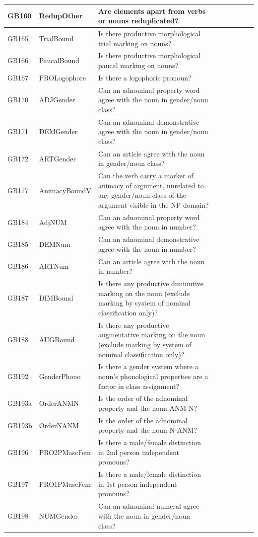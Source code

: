 \documentclass[draft,10pt]{article} %
\begin{document}
\begin{landscape}
\begin{longtable}{| l | p{4cm}| p{12cm}|p{2cm}|p{2cm}|p{2cm}|p{2cm}|p{2cm}|p{2cm}|}
GB160 & RedupOther&Are elements apart from verbs or nouns reduplicated?\\ \hline
GB165 & TrialBound&Is there productive morphological trial marking on nouns?\\ \hline
GB166 & PaucalBound&Is there productive morphological paucal marking on nouns?\\ \hline
GB167 & PROLogophore&Is there a logophoric pronoun?\\ \hline
GB170 & ADJGender&Can an adnominal property word agree with the noun in gender/noun class?\\ \hline
GB171 & DEMGender&Can an adnominal demonstrative agree with the noun in gender/noun class?\\ \hline
GB172 & ARTGender&Can an article agree with the noun in gender/noun class?\\ \hline
GB177 & AnimacyBoundV&Can the verb carry a marker of animacy of argument, unrelated to any gender/noun class of the argument visible in the NP domain?\\ \hline
GB184 & AdjNUM&Can an adnominal property word agree with the noun in number?\\ \hline
GB185 & DEMNum&Can an adnominal demonstrative agree with the noun in number?\\ \hline
GB186 & ARTNum&Can an article agree with the noun in number?\\ \hline
GB187 & DIMBound&Is there any productive diminutive marking on the noun (exclude marking by system of nominal classification only)?\\ \hline
GB188 & AUGBound&Is there any productive augmentative marking on the noun (exclude marking by system of nominal classification only)?\\ \hline
GB192 & GenderPhono&Is there a gender system where a noun's phonological properties are a factor in class assignment?\\ \hline
GB193a & OrderANMN&Is the order of the adnominal property and the noun ANM-N?\\ \hline
GB193b & OrderNANM&Is the order of the adnominal property and the noun N-ANM?\\ \hline
GB196 & PRO2PMascFem&Is there a male/female distinction in 2nd person independent pronouns?\\ \hline
GB197 & PRO1PMascFem&Is there a male/female distinction in 1st person independent pronouns?\\ \hline
GB198 & NUMGender&Can an adnominal numeral agree with the noun in gender/noun class?\\ \hline

\end{longtable}
\end{landscape}
\end{document}

